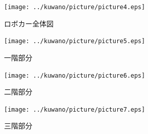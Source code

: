 \begin{figure}[hb]
 \begin{center}
  \texttt{[image: ../kuwano/picture/picture4.eps]}
  \caption{ロボカー全体図}
  \label{fig:robocar}
 \end{center}
\end{figure}

\begin{figure}[H]
 \begin{center}
  \texttt{[image: ../kuwano/picture/picture5.eps]}
  \caption{一階部分}
  \label{fig:1F}
 \end{center}
\end{figure}

\begin{figure}[H]
 \begin{center}
  \texttt{[image: ../kuwano/picture/picture6.eps]}
  \caption{二階部分}
  \label{fig:2F}
 \end{center}
\end{figure}

\begin{figure}[H]
 \begin{center}
  \texttt{[image: ../kuwano/picture/picture7.eps]}
  \caption{三階部分}
  \label{fig:3F}
 \end{center}
\end{figure}
